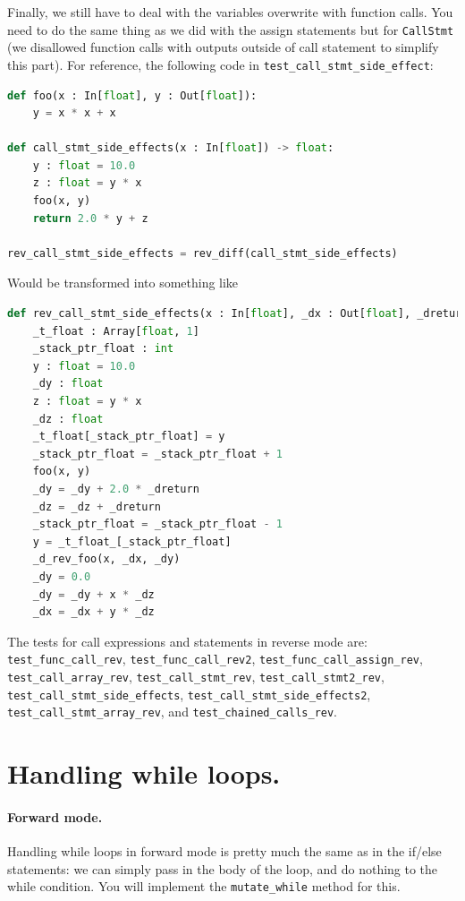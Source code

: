 Finally, we still have to deal with the variables overwrite with function calls. You need to do the same thing as we did with the assign statements but for \lstinline{CallStmt} (we disallowed function calls with outputs outside of call statement to simplify this part). For reference, the following code in \lstinline{test_call_stmt_side_effect}:
\begin{lstlisting}[language=Python]
def foo(x : In[float], y : Out[float]):
    y = x * x + x

def call_stmt_side_effects(x : In[float]) -> float:
    y : float = 10.0
    z : float = y * x
    foo(x, y)
    return 2.0 * y + z

rev_call_stmt_side_effects = rev_diff(call_stmt_side_effects)
\end{lstlisting}
Would be transformed into something like
\begin{lstlisting}[language=Python]
def rev_call_stmt_side_effects(x : In[float], _dx : Out[float], _dreturn : In[float]):
    _t_float : Array[float, 1]
    _stack_ptr_float : int
    y : float = 10.0
    _dy : float
    z : float = y * x
    _dz : float
    _t_float[_stack_ptr_float] = y
    _stack_ptr_float = _stack_ptr_float + 1
    foo(x, y)
    _dy = _dy + 2.0 * _dreturn
    _dz = _dz + _dreturn
    _stack_ptr_float = _stack_ptr_float - 1
    y = _t_float_[_stack_ptr_float]
    _d_rev_foo(x, _dx, _dy)
    _dy = 0.0
    _dy = _dy + x * _dz
    _dx = _dx + y * _dz
\end{lstlisting}

The tests for call expressions and statements in reverse mode are: \lstinline{test_func_call_rev}, \lstinline{test_func_call_rev2}, \lstinline{test_func_call_assign_rev}, \lstinline{test_call_array_rev}, \lstinline{test_call_stmt_rev}, \lstinline{test_call_stmt2_rev}, \lstinline{test_call_stmt_side_effects}, \lstinline{test_call_stmt_side_effects2}, \lstinline{test_call_stmt_array_rev}, and \lstinline{test_chained_calls_rev}.

\section{Handling while loops.}

\paragraph{Forward mode.} Handling while loops in forward mode is pretty much the same as in the if/else statements: we can simply pass in the body of the loop, and do nothing to the while condition. You will implement the \lstinline{mutate_while} method for this.

